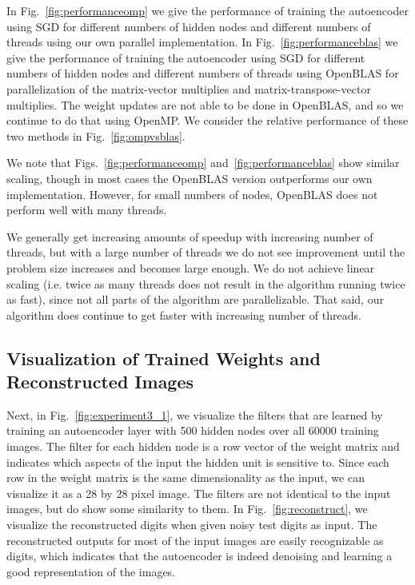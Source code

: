 In  Fig.~\ref{fig:performanceomp} we give the performance of training the autoencoder using SGD for different numbers of hidden nodes and different numbers of threads using our own parallel implementation.
In  Fig.~\ref{fig:performanceblas} we give the performance of training the autoencoder using SGD for different numbers of hidden nodes and different numbers of threads using OpenBLAS for parallelization of the matrix-vector multiplies and
matrix-transpose-vector multiplies. The weight updates are not able to be done in OpenBLAS, and so we continue to do that using OpenMP.
We consider the relative performance of these two methods in Fig.~\ref{fig:ompvsblas}.

We note that Figs.~\ref{fig:performanceomp} and~\ref{fig:performanceblas} show similar scaling, though in most cases the OpenBLAS version outperforms our own implementation. However, for small numbers of nodes, OpenBLAS does not perform well with many threads.

We generally get increasing amounts of speedup with increasing number of threads, but with a large number of threads we do not see improvement until the problem size increases and becomes large enough. We do not achieve linear scaling (i.e. twice as many threads does not result in the algorithm running twice as fast), since not all parts of the algorithm are parallelizable. That said, our algorithm does continue to get faster with increasing number of threads.

\subsection{Visualization of Trained Weights and Reconstructed Images}

Next, in Fig.~\ref{fig:experiment3_1}, we visualize the filters that are
learned by training an autoencoder layer with 500 hidden nodes over all 60000
training images. The  filter for each hidden node is a row vector of the weight
matrix and indicates which aspects of the input the hidden unit is sensitive
to. Since each row in the weight matrix is the same dimensionality as the
input, we can visualize it as a 28 by 28 pixel image. The filters are not
identical to the input images, but do show some similarity to them. In
Fig.~\ref{fig:reconstruct}, we visualize the reconstructed digits when given
noisy test digits as input. The reconstructed outputs for most of the input
images are easily recognizable as digits, which indicates that the autoencoder
is indeed denoising and learning a good representation of the images.


